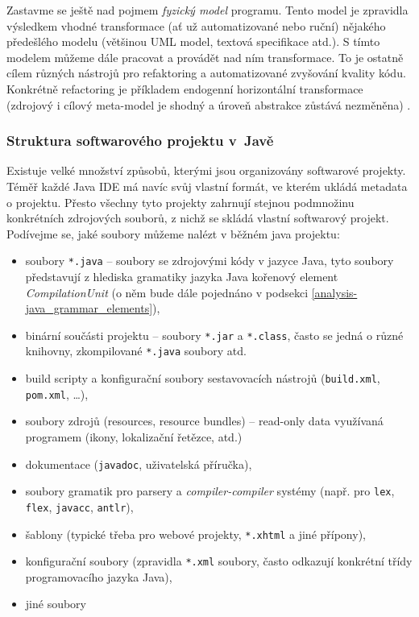 Zastavme se ještě nad pojmem \emph{fyzický model} programu. Tento model je zpravidla výsledkem vhodné transformace (ať už automatizované nebo ruční) nějakého předešlého modelu (většinou UML model, textová specifikace atd.). S tímto modelem můžeme dále pracovat a provádět nad ním transformace. To je ostatně cílem různých nástrojů pro refaktoring a automatizované zvyšování kvality kódu. Konkrétně refactoring je příkladem endogenní horizontální transformace (zdrojový i cílový meta-model je shodný a úroveň abstrakce zůstává nezměněna) \cite{Mens05ataxonomy}.

\subsubsection{Struktura softwarového projektu v~Javě}
Existuje velké množství způsobů, kterými jsou organizovány softwarové projekty. Téměř každé Java IDE má navíc svůj vlastní formát, ve kterém ukládá metadata o projektu. Přesto všechny tyto projekty zahrnují stejnou podmnožinu konkrétních zdrojových souborů, z nichž se skládá vlastní softwarový projekt. Podívejme se, jaké soubory můžeme nalézt v běžném java projektu:

\begin{itemize}
\item soubory \verb+*.java+ -- soubory se zdrojovými kódy v jazyce Java, tyto soubory představují z hlediska gramatiky jazyka Java kořenový element \emph{CompilationUnit} (o něm bude dále pojednáno v podsekci \ref{analysis-java_grammar_elements}),
\item binární součásti projektu -- soubory \verb+*.jar+ a \verb+*.class+, často se jedná o různé knihovny, zkompilované \verb+*.java+ soubory atd.
\item build scripty a konfigurační soubory sestavovacích nástrojů (\verb+build.xml+, \verb+pom.xml+, \ldots),
\item soubory zdrojů (resources, resource bundles) -- read-only data využívaná programem (ikony, lokalizační řetězce, atd.)
\item dokumentace (\verb+javadoc+, uživatelská příručka),
\item soubory gramatik pro parsery a \emph{compiler-compiler} systémy (např. pro \verb+lex+, \verb+flex+, \verb+javacc+, \verb+antlr+),
\item šablony (typické třeba pro webové projekty, \verb+*.xhtml+ a jiné přípony),
\item konfigurační soubory (zpravidla \verb+*.xml+ soubory, často odkazují konkrétní třídy programovacího jazyka Java),
\item jiné soubory
\end{itemize}

